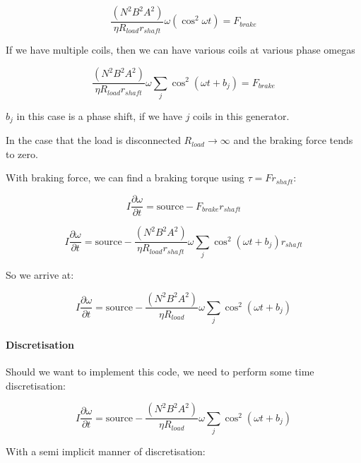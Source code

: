 \documentclass[masters]{ucbthesis}
\renewcommand{\_}{\kern-1.5pt\textunderscore\kern-1.5pt}
\begin{document}
\begin{equation*}
	\frac{( N^2 B^2 A^2 )}{\eta R_{load} r_{shaft}}\omega (\cos^2 \omega t) = F_{brake} 
\end{equation*}

If we have multiple coils, then we can have various coils at various 
phase omegas

\begin{equation*}
	\frac{( N^2 B^2 A^2 )}{\eta R_{load} r_{shaft}}\omega 
	\sum_j \cos^2 (\omega t + b_j) = F_{brake} 
\end{equation*}

$b_j$ in this case is a phase shift, if we have $j$ coils in this generator.


In the case that the load is disconnected $R_{load} \rightarrow \infty$ 
and the braking force tends to zero.

With braking force, we can find a braking torque using $\tau = F r_{shaft}$:

\begin{equation*}
	I \frac{\partial  \omega}{\partial t} = \text{source} 
	- F_{brake} r_{shaft} 
\end{equation*}

\begin{equation*}
	I \frac{\partial  \omega}{\partial t} = \text{source} 
	- \frac{( N^2 B^2 A^2 )}{\eta R_{load} r_{shaft}}\omega 
	\sum_j \cos^2 (\omega t + b_j) r_{shaft} 
\end{equation*}

So we arrive at:

\begin{equation*}
	I \frac{\partial  \omega}{\partial t} = \text{source} 
	- \frac{( N^2 B^2 A^2 )}{\eta R_{load} }\omega 
	\sum_j \cos^2 (\omega t + b_j)  
\end{equation*}

\paragraph{Discretisation}
Should we want to implement this code, we need to perform some time 
discretisation:

\begin{equation*}
	I \frac{\partial  \omega}{\partial t} = \text{source} 
	- \frac{( N^2 B^2 A^2 )}{\eta R_{load} }\omega 
	\sum_j \cos^2 (\omega t + b_j)  
\end{equation*}

With a semi implicit manner of discretisation:
\end{document}
